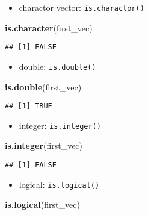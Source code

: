 \documentclass[]{book}
\newenvironment{Shaded}{\begin{snugshade}}{\end{snugshade}}
\newcommand{\KeywordTok}[1]{\textcolor[rgb]{0.13,0.29,0.53}{\textbf{#1}}}
\newcommand{\NormalTok}[1]{#1}
\providecommand{\tightlist}{%
  \setlength{\itemsep}{0pt}\setlength{\parskip}{0pt}}
\begin{document}
\begin{itemize}
\tightlist
\item
  charactor vector: \texttt{is.charactor()}
\end{itemize}

\begin{Shaded}
\begin{Highlighting}[]
\KeywordTok{is.character}\NormalTok{(first_vec)}
\end{Highlighting}
\end{Shaded}

\begin{verbatim}
## [1] FALSE
\end{verbatim}

\begin{itemize}
\tightlist
\item
  double: \texttt{is.double()}
\end{itemize}

\begin{Shaded}
\begin{Highlighting}[]
\KeywordTok{is.double}\NormalTok{(first_vec)}
\end{Highlighting}
\end{Shaded}

\begin{verbatim}
## [1] TRUE
\end{verbatim}

\begin{itemize}
\tightlist
\item
  integer: \texttt{is.integer()}
\end{itemize}

\begin{Shaded}
\begin{Highlighting}[]
\KeywordTok{is.integer}\NormalTok{(first_vec)}
\end{Highlighting}
\end{Shaded}

\begin{verbatim}
## [1] FALSE
\end{verbatim}

\begin{itemize}
\tightlist
\item
  logical: \texttt{is.logical()}
\end{itemize}

\begin{Shaded}
\begin{Highlighting}[]
\KeywordTok{is.logical}\NormalTok{(first_vec)}
\end{Highlighting}
\end{Shaded}
\end{document}
